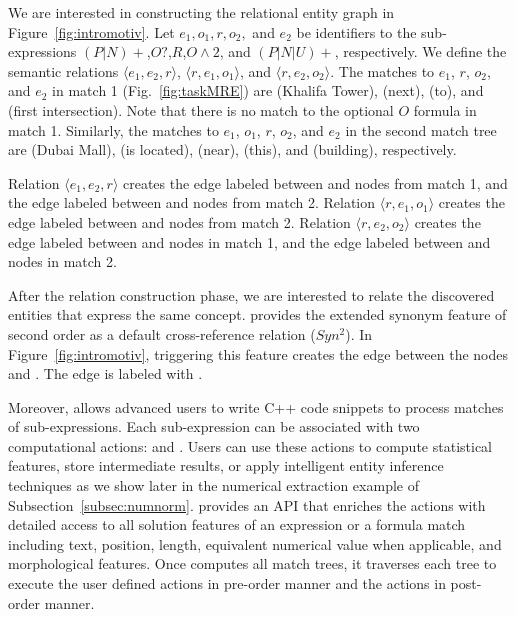 We are interested in constructing the relational entity graph in Figure~\ref{fig:intromotiv}.
Let $e_1,o_1,r,o_2,$ and $e_2$ be identifiers to the sub-expressions 
$(P|N)+$,$O?$,$R$,$O\wedge 2$, and $(P|N|U)+$, respectively.
We define the semantic relations $\langle e_1, e_2, r\rangle$, $\langle r, e_1, o_1\rangle$, and $\langle r,e_2,o_2\rangle$.
The matches to $e_1$, $r$, $o_2$, and $e_2$ in match 1 (Fig.~\ref{fig:taskMRE}) are  (Khalifa Tower),  (next),  (to), and  (first intersection).
Note that there is no match to the optional $O$ formula in match 1.
Similarly, the matches to $e_1$, $o_1$, $r$, $o_2$, and $e_2$ in the second match tree are
 (Dubai Mall),  (is located),  (near),  (this), and  (building), respectively.

Relation $\langle e_1,e_2,r\rangle$ creates the 
edge labeled  between  and 
 nodes from match 1, and the 
edge labeled  between  and  nodes from match 2.
Relation $\langle r,e_1,o_1\rangle$ creates the edge labeled  
between  and  nodes from match 2. 
Relation $\langle r,e_2,o_2\rangle$ creates the edge labeled  
between  and  nodes in 
match 1, and the 
edge labeled  between  and  
nodes in match 2.

After the relation construction phase, we are interested to relate the discovered entities
that express the same concept.
\framework provides the extended synonym feature of second order as a default cross-reference relation ($Syn^2$).
In Figure~\ref{fig:intromotiv}, triggering this feature creates the edge between the nodes  and .
The edge is labeled with .

Moreover, \framework allows advanced users to write C++ code snippets 
to process matches of sub-expressions.
Each sub-expression can be associated with two computational actions:  and .
Users can use these actions to compute statistical features, 
store intermediate results, 
or apply intelligent entity inference techniques
as we show later in the numerical extraction example of Subsection~\ref{subsec:numnorm}.
\framework provides an API that enriches the actions with detailed access to
all solution features of an expression or a formula match including 
text, position, length, equivalent numerical value when applicable, 
and morphological features.
Once \framework computes all match trees, it traverses each tree to 
execute the user defined  actions in pre-order manner
and the  actions in post-order manner.


